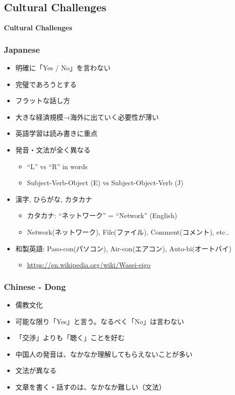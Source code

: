 \documentclass[aspectratio=169,11pt,hyperref={colorlinks=true}]{beamer}
\begin{document}
\subsection{Cultural Challenges}
\begin{frame}
  \bf\Huge{Cultural Challenges}
\end{frame}

\begin{frame}
\frametitle{Japanese}
  \begin{itemize}
    \item 明確に「Yes / No」を言わない
    \item 完璧であろうとする
    \item フラットな話し方
    \item 大きな経済規模→海外に出ていく必要性が薄い
    \item 英語学習は読み書きに重点
    \item 発音・文法が全く異なる
      \begin{itemize}
      \item ``L'' vs ``R'' in words
      \item Subject-Verb-Object (E) vs Subject-Object-Verb (J)
      \end{itemize}
    \item 漢字, ひらがな, カタカナ
      \begin{itemize}
      \item カタカナ: ``ネットワーク'' = ``Network'' (English)
      \item Network(ネットワーク), File(ファイル), Comment(コメント), etc..
      \end{itemize}
    \item 和製英語: Paso-con(パソコン), Air-con(エアコン), Auto-bi(オートバイ)
      \begin{itemize}
        \item \url{https://en.wikipedia.org/wiki/Wasei-eigo}
      \end{itemize}
  \end{itemize}
\end{frame}

\begin{frame}
\frametitle{Chinese - Dong}
  \begin{itemize}
  \item 儒教文化
  \item 可能な限り「Yes」と言う。なるべく「No」は言わない
  \item 「交渉」よりも「聴く」ことを好む
  \item 中国人の発音は、なかなか理解してもらえないことが多い
  \item 文法が異なる
  \item 文章を書く・話すのは、なかなか難しい（文法）
  \end{itemize}
\end{frame}
\end{document}
